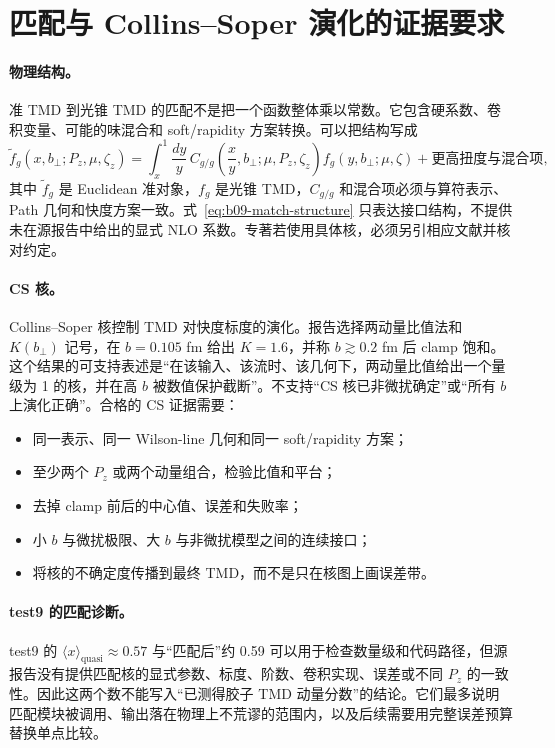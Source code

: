 \section{匹配与 Collins--Soper 演化的证据要求}

\paragraph{物理结构。}
准 TMD 到光锥 TMD 的匹配不是把一个函数整体乘以常数。它包含硬系数、卷积变量、可能的味混合和 soft/rapidity 方案转换。可以把结构写成
\begin{equation}
  \widetilde f_g(x,b_\perp;P_z,\mu,\zeta_z)
  =\int_x^1\frac{dy}{y}\,
  C_{g/g}\!\left(\frac{x}{y},b_\perp;\mu,P_z,\zeta_z\right)
  f_g(y,b_\perp;\mu,\zeta)
  +\text{更高扭度与混合项},
  \label{eq:b09-match-structure}
\end{equation}
其中 \(\widetilde f_g\) 是 Euclidean 准对象，\(f_g\) 是光锥 TMD，\(C_{g/g}\) 和混合项必须与算符表示、Path 几何和快度方案一致。式~\eqref{eq:b09-match-structure} 只表达接口结构，不提供未在源报告中给出的显式 NLO 系数。专著若使用具体核，必须另引相应文献并核对约定。

\paragraph{CS 核。}
Collins--Soper 核控制 TMD 对快度标度的演化。报告选择两动量比值法和 \(K(b_\perp)\) 记号，在 \(b=0.105\) fm 给出 \(K=1.6\)，并称 \(b\gtrsim0.2\) fm 后 clamp 饱和。这个结果的可支持表述是“在该输入、该流时、该几何下，两动量比值给出一个量级为 1 的核，并在高 \(b\) 被数值保护截断”。不支持“CS 核已非微扰确定”或“所有 \(b\) 上演化正确”。合格的 CS 证据需要：
\begin{itemize}
  \item 同一表示、同一 Wilson-line 几何和同一 soft/rapidity 方案；
  \item 至少两个 \(P_z\) 或两个动量组合，检验比值和平台；
  \item 去掉 clamp 前后的中心值、误差和失败率；
  \item 小 \(b\) 与微扰极限、大 \(b\) 与非微扰模型之间的连续接口；
  \item 将核的不确定度传播到最终 TMD，而不是只在核图上画误差带。
\end{itemize}

\paragraph{test9 的匹配诊断。}
test9 的 \(\langle x\rangle_{\mathrm{quasi}}\approx0.57\) 与“匹配后”约 0.59 可以用于检查数量级和代码路径，但源报告没有提供匹配核的显式参数、标度、阶数、卷积实现、误差或不同 \(P_z\) 的一致性。因此这两个数不能写入“已测得胶子 TMD 动量分数”的结论。它们最多说明匹配模块被调用、输出落在物理上不荒谬的范围内，以及后续需要用完整误差预算替换单点比较。


